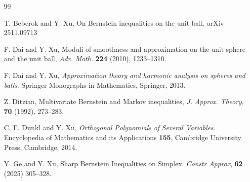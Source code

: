 \documentclass{amsart}
\theoremstyle{remark}
\begin{document}
\begin{thebibliography}{99}
       

    

        T. Beberok and Y. Xu, 
        On Bernstein inequalities on the unit ball, {\textsf arXiv 2511.09713}
 
       F. Dai and Y. Xu,
       Moduli of smoothness and approximation on the unit sphere and the unit ball, 
       \textit{Adv. Math.} \textbf{224} (2010), 1233--1310.

        F. Dai and Y. Xu,
        \textit{Approximation theory and harmonic analysis on spheres and balls}.
        Springer Monographs in Mathematics, Springer, 2013.  
      
        Z. Ditzian, 
        Multivariate Bernstein and Markov inequalities, 
        \textit{J. Approx. Theory}, \textbf{70} (1992), 273--283.
        
        C. F. Dunkl and Y. Xu,
        \textit{Orthogonal Polynomials of Several Variables}.
        Encyclopedia of Mathematics and its Applications \textbf{155},
        Cambridge University Press, Cambridge, 2014.
        
         Y. Ge and Y. Xu, 
         Sharp Bernstein Inequalities on Simplex. 
         \emph{Constr Approx}, \textbf{62} (2025) 305--328.
          


\end{thebibliography}
\end{document}
